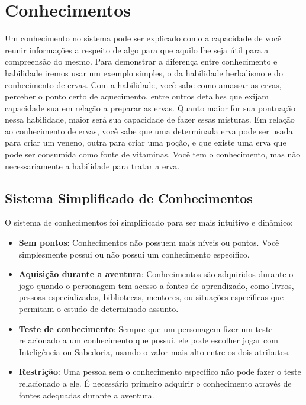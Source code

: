 \section{Conhecimentos}

Um conhecimento no sistema pode ser explicado como a capacidade de você reunir informações a respeito de algo para que aquilo lhe seja útil para a compreensão do mesmo. Para demonstrar a diferença entre conhecimento e habilidade iremos usar um exemplo simples, o da habilidade herbalismo e do conhecimento de ervas. Com a habilidade, você sabe como amassar as ervas, perceber o ponto certo de aquecimento, entre outros detalhes que exijam capacidade sua em relação a preparar as ervas. Quanto maior for sua pontuação nessa habilidade, maior será sua capacidade de fazer essas misturas. Em relação ao conhecimento de ervas, você sabe que uma determinada erva pode ser usada para criar um veneno, outra para criar uma poção, e que existe uma erva que pode ser consumida como fonte de vitaminas. Você tem o conhecimento, mas não necessariamente a habilidade para tratar a erva.

\subsection{Sistema Simplificado de Conhecimentos}

O sistema de conhecimentos foi simplificado para ser mais intuitivo e dinâmico:

\begin{itemize}
	\item \textbf{Sem pontos}: Conhecimentos não possuem mais níveis ou pontos. Você simplesmente possui ou não possui um conhecimento específico.
	
	\item \textbf{Aquisição durante a aventura}: Conhecimentos são adquiridos durante o jogo quando o personagem tem acesso a fontes de aprendizado, como livros, pessoas especializadas, bibliotecas, mentores, ou situações específicas que permitam o estudo de determinado assunto.
	
	\item \textbf{Teste de conhecimento}: Sempre que um personagem fizer um teste relacionado a um conhecimento que possui, ele pode escolher jogar com Inteligência ou Sabedoria, usando o valor mais alto entre os dois atributos.
	
	\item \textbf{Restrição}: Uma pessoa sem o conhecimento específico não pode fazer o teste relacionado a ele. É necessário primeiro adquirir o conhecimento através de fontes adequadas durante a aventura.
\end{itemize}

